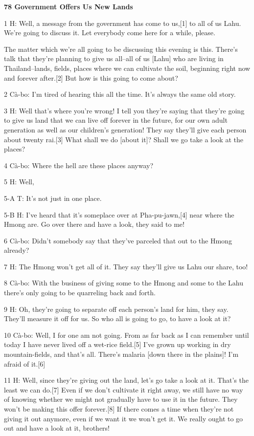 
{\textbf{78 Government Offers Us New Lands}}

{1 H: Well, a message from the government has come to us,[1] to all of us
Lahu. We're going to discuss it. Let everybody come here for a while, please.}

{The matter which we're all going to be discussing this evening is this.
There's talk that they're planning to give us all--all of us [Lahu] who are living
in Thailand--lands, fields, places where we can cultivate the soil, beginning right
now and forever after.[2] But how is this going to come about?}

{2 Cà-bo: I'm tired of hearing this all the time. It's always the same
old story. }

{3 H: Well that's where you're wrong! I tell you they're saying that they're
going to give us land that we can live off forever in the future, for our own adult
generation as well as our children's generation! They say they'll give each person
about twenty rai.[3] What shall we do [about it]? Shall we go take a look at the
places? }

{4 Cà-bo: Where the hell are these places anyway?}

{5 H: Well, }

{5-A T: It's not just in one place.}

{5-B H: I've heard that it's someplace over at Pha-pu-jawn,[4] near where
the Hmong are. Go over there and have a look, they said to me!}

{6 Cà-bo: Didn't somebody say that they've parceled that out to the Hmong
already?}

{7 H: The Hmong won't get all of it. They say they'll give us Lahu our share,
too! }

{8 Cà-bo: With the business of giving some to the Hmong and some to the
Lahu there's only going to be quarreling back and forth.}

{9 H: Oh, they're going to separate off each person's land for him, they
say. They'll measure it off for us. So who all is going to go, to have a look at
it?}

{10 Cà-bo: Well, I for one am not going. From as far back as I can remember
until today I have never lived off a wet-rice field.[5] I've grown up working in
dry mountain-fields, and that's all. There's malaria [down there in the plains]!
I'm afraid of it.[6]}

{11 H: Well, since they're giving out the land, let's go take a look at
it. That's the least we can do.[7] Even if we don't cultivate it right away, we
still have no way of knowing whether we might not gradually have to use it in the
future. They won't be making this offer forever.[8] If there comes a time when
they're not giving it out anymore, even if we want it we won't get it. We really
ought to go out and have a look at it, brothers!}

